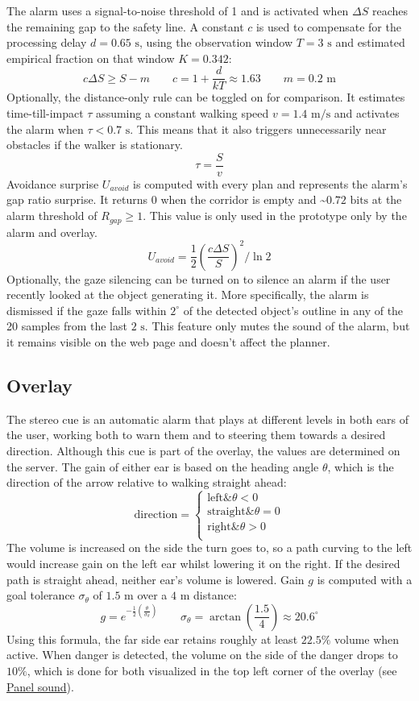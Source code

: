 \documentclass[a4paper]{article}
\begin{document}
The alarm uses a signal-to-noise threshold of 1 and is activated when $\Delta S$ reaches the remaining gap to the safety line. A constant $c$ is used to compensate for the processing delay $d = 0.65 \text{ s}$, using the observation window $T = 3 \text{ s}$ and estimated empirical fraction on that window $K=0.342$:
$$
c\Delta S \ge S-m
\qquad c = 1+ \frac{d}{kT} \approx 1.63
\qquad m=0.2 \text{ m}
$$
Optionally, the distance-only rule can be toggled on for comparison. It estimates time-till-impact $\tau$ assuming a constant walking speed $v=1.4 \text{ m/s}$ and activates the alarm when $\tau < 0.7 \text{ s}$. This means that it also triggers unnecessarily near obstacles if the walker is stationary.
$$
\tau=\frac{S}{v}
$$
Avoidance surprise $U_{avoid}$ is computed with every plan and represents the alarm's gap ratio surprise. It returns $0$ when the corridor is empty and \textasciitilde $0.72 \text { bits}$ at the alarm threshold of $R_{gap} \ge1$. This value is only used in the prototype only by the alarm and overlay. 
$$
U_{avoid}=\frac{1}{2} \left( \frac{c\Delta S}{S} \right)^2 \Big/ \ln 2
$$
Optionally, the gaze silencing can be turned on to silence an alarm if the user recently looked at the object generating it. More specifically, the alarm is dismissed if the gaze falls within $2^{\circ}$ of the detected object's outline in any of the 20 samples from the last $2\text{ s}$. This feature only mutes the sound of the alarm, but it remains visible on the web page and doesn't affect the planner.

\subsection{Overlay} \label{overlay}
The stereo cue is an automatic alarm that plays at different levels in both ears of the user, working both to warn them and to steering them towards a desired direction. Although this cue is part of the overlay, the values are determined on the server. The gain of either ear is based on the heading angle $\theta$, which is the direction of the arrow relative to walking straight ahead:
$$
\text{direction} = 
\begin{cases}
	 \text{left} \& \theta < 0 \\ 
	 \text{straight} \& \theta = 0 \\
     \text{right} \& \theta > 0 \\
\end{cases}
$$
The volume is increased on the side the turn goes to, so a path curving to the left would increase gain on the left ear whilst lowering it on the right. If the desired path is straight ahead, neither ear's volume is lowered. Gain $g$ is computed with a goal tolerance $\sigma_{\theta}$ of $1.5 \text{ m}$ over a $4\text{ m}$ distance:
$$
g=e^{-\frac{1}{2}\left( \frac{\theta}{\sigma_{\theta}} \right)}
\qquad
\sigma_{\theta}=\arctan\left( \frac{1.5}{4} \right) \approx 20.6^\circ
$$
Using this formula, the far side ear retains roughly at least $22.5\%$ volume when active. When danger is detected, the volume on the side of the danger drops to $10\%$, which is done for both visualized in the top left corner of the overlay (see \hyperref[panel-sound]{Panel sound}).
\end{document}
